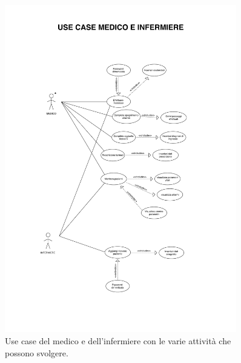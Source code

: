 \documentclass{article}
\begin{document}
	\begin{figure}[H]

		\includegraphics[width=0.9\textwidth]{documenti/useCase_infermiere.pdf}
		\caption{Use case del medico e dell'infermiere con le varie attività che possono svolgere.}
		\label{usecase_medico_infermiere}

	\end{figure}

	\vspace{0.5cm}
\end{document}
